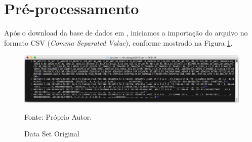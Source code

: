 \documentclass[
	12pt,				%
	openright,			%
	oneside,	
	a4paper,				%
	english,				%
	brazil				%
]{abntex2/abntex2} %
\begin{document}

	
	\section{Pré-processamento}
	
	Após o download da base de dados em \cite{fortaleza:2015},  iniciamos a importação do arquivo no formato CSV (\textit{Comma Separated Value}), conforme mostrado na Figura \ref{figdataSetOriginal}.
	
		
		\begin{figure}[!htb]
			\caption{\label{figdataSetOriginal} Data Set Original}
			\begin{center}
				\includegraphics[scale=0.4]{img/dataSetOriginal.png}
			\end{center}
			Fonte: Próprio Autor.
		\end{figure}
	
\end{document}
